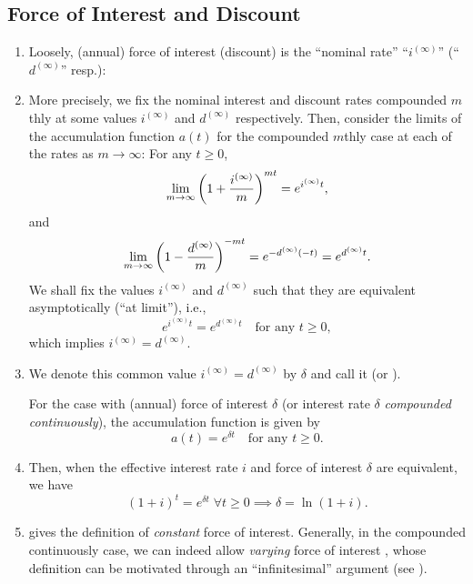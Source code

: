 \subsection{Force of Interest and Discount}
\begin{enumerate}
\item Loosely, (annual) force of interest (discount) is the ``nominal rate''
``\(i^{(\infty)}\)'' (``\(d^{(\infty)}\)'' resp.):
\begin{center}
\end{center}
\item More precisely, we fix the nominal interest and discount rates compounded
\(m\)thly at some values \(i^{(\infty)}\) and \(d^{(\infty)}\) respectively.
Then, consider the limits of the accumulation function \(a(t)\) for the
compounded \(m\)thly case at each of the rates as \(m\to\infty\): For any
\(t\ge 0\),
\[
\lim_{m\to \infty}\qty(1+\frac{i^{(\infty)}}{m})^{mt}=e^{i^{(\infty)}t},
\]
and
\[
\lim_{m\to \infty}\qty(1-\frac{d^{(\infty)}}{m})^{-mt}=e^{-d^{(\infty)}(-t)}
=e^{d^{(\infty)}t}.
\]
We shall fix the values \(i^{(\infty)}\) and \(d^{(\infty)}\) such that they
are equivalent asymptotically (``at limit''), i.e.,
\[
e^{i^{(\infty)}t}=e^{d^{(\infty)}t}\quad\text{for any \(t\ge 0\)},
\]
which implies \(i^{(\infty)}=d^{(\infty)}\).

\item \label{it:foi-fod}
We denote this common value \(i^{(\infty)}=d^{(\infty)}\) by \(\delta\)
and call it  (or ).

For the  case with (annual) force of interest
\(\delta\) (or interest rate \(\delta\) \emph{compounded continuously}), the
accumulation function is given by
\[
a(t)=e^{\delta t}\quad\text{for any \(t\ge 0\)}.
\]
\item \label{it:foi-effective-equiv-fmla}
Then, when the effective interest rate \(i\) and force of interest \(\delta\)
are equivalent, we have
\[
(1+i)^t=e^{\delta t}\;\forall t\ge 0
\implies \boxed{\delta=\ln(1+i)}.
\]
\item {} gives the definition of \emph{constant} force of
interest. Generally, in the compounded continuously case, we can indeed allow
\emph{varying} force of interest , whose definition can be motivated through an
``infinitesimal'' argument (see ).


\end{enumerate}
